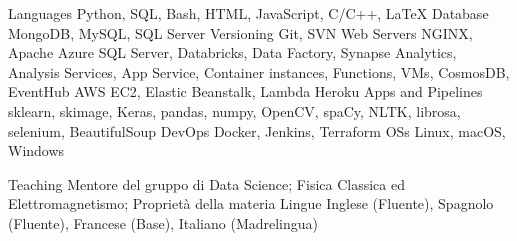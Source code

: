 

\begin{cvskills}
  \cvskill
    {Languages}
    {Python, SQL, Bash, HTML, JavaScript, C/C++, LaTeX}
  \cvskill
    {Database}
    {MongoDB, MySQL, SQL Server}
  \cvskill
    {Versioning}
    {Git, SVN}
  \cvskill
    {Web Servers}
    {NGINX, Apache}
  \cvskill
    {Azure}
    {SQL Server, Databricks, Data Factory, Synapse Analytics, Analysis Services, App Service, Container instances, Functions, VMs, CosmosDB, EventHub}
  \cvskill
    {AWS}
    {EC2, Elastic Beanstalk, Lambda}
  \cvskill
    {Heroku}
    {Apps and Pipelines}
  {sklearn, skimage, Keras, pandas, numpy, OpenCV, spaCy, NLTK, librosa, selenium, BeautifulSoup}
  \cvskill
    {DevOps}
    {Docker, Jenkins, Terraform}
  \cvskill
    {OSs}
    {Linux, macOS, Windows}
\end{cvskills}






\begin{cvskills}
  \cvskill
    {Teaching}
    {Mentore del gruppo di Data Science; Fisica Classica ed Elettromagnetismo; Proprietà della materia}
  \cvskill
    {Lingue}
    {Inglese (Fluente), Spagnolo (Fluente), Francese (Base), Italiano (Madrelingua)}
\end{cvskills}
